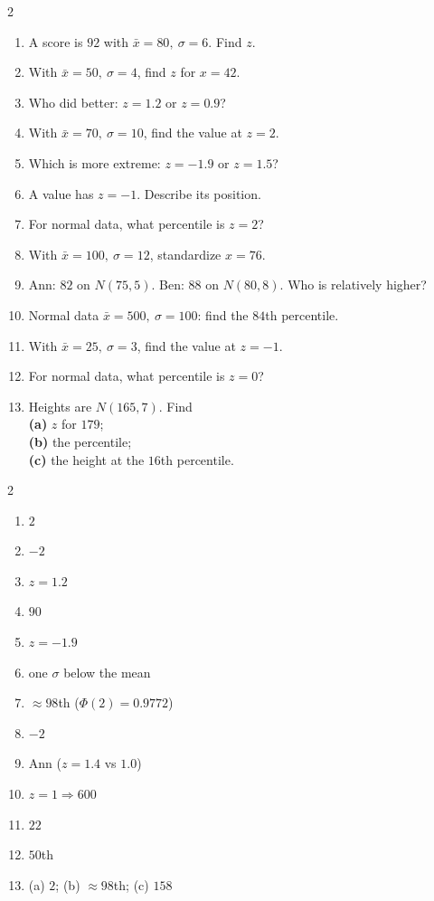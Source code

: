 \documentclass[11pt]{article}
\begin{document}
\clearpage
{}

\begin{recapbox}
\begin{multicols}{2}
\small
\begin{enumerate}[leftmargin=*,itemsep=3pt]
  \item A score is $92$ with $\bar x=80,\ \sigma=6$. Find $z$.
  \item With $\bar x=50,\ \sigma=4$, find $z$ for $x=42$.
  \item Who did better: $z=1.2$ or $z=0.9$?
  \item With $\bar x=70,\ \sigma=10$, find the value at $z=2$.
  \item Which is more extreme: $z=-1.9$ or $z=1.5$?
  \item A value has $z=-1$. Describe its position.
  \item For normal data, what percentile is $z=2$?
  \item With $\bar x=100,\ \sigma=12$, standardize $x=76$.
  \item Ann: $82$ on $N(75,5)$. Ben: $88$ on $N(80,8)$. Who is relatively higher?
  \item Normal data $\bar x=500,\ \sigma=100$: find the $84$th percentile.
  \item With $\bar x=25,\ \sigma=3$, find the value at $z=-1$.
  \item For normal data, what percentile is $z=0$?
  \item Heights are $N(165,7)$. Find \\ \textbf{(a)} $z$ for $179$; \\ \textbf{(b)} the percentile; \\ \textbf{(c)} the height at the $16$th percentile.
\end{enumerate}
\end{multicols}
\end{recapbox}

\begin{keybox}
\begin{multicols}{2}
\small
\begin{enumerate}[leftmargin=*,itemsep=3pt]
  \item $2$
  \item $-2$
  \item $z=1.2$
  \item $90$
  \item $z=-1.9$
  \item one $\sigma$ below the mean
  \item $\approx98$th ($\Phi(2)=0.9772$)
  \item $-2$
  \item Ann ($z=1.4$ vs $1.0$)
  \item $z=1\Rightarrow600$
  \item $22$
  \item $50$th
  \item (a) $2$; (b) $\approx98$th; (c) $158$
\end{enumerate}
\end{multicols}
\end{keybox}
\end{document}
